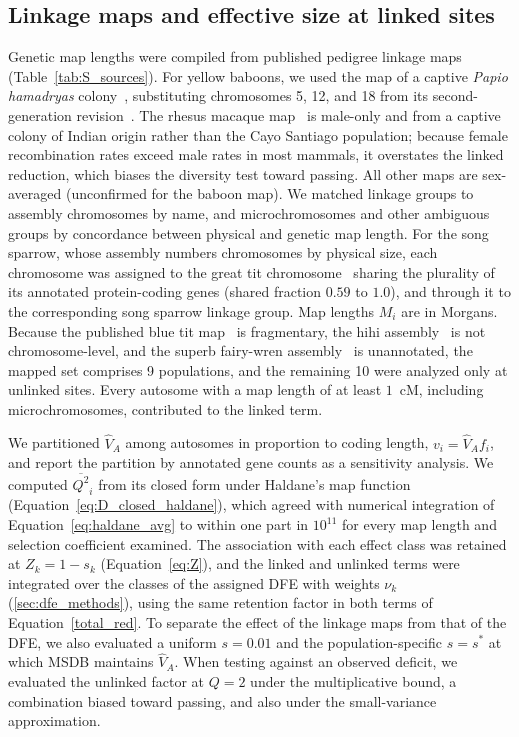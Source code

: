 \documentclass{article}
\begin{document}
\subsection{Linkage maps and effective size at linked sites}\label{sec:linked_methods}
Genetic map lengths were compiled from published pedigree linkage maps (Table~\ref{tab:S_sources}). For yellow baboons, we used the map of a captive \emph{Papio hamadryas} colony~\cite{rogers2000}, substituting chromosomes 5, 12, and 18 from its second-generation revision~\cite{cox2006}. The rhesus macaque map~\cite{versoza2024} is male-only and from a captive colony of Indian origin rather than the Cayo Santiago population; because female recombination rates exceed male rates in most mammals, it overstates the linked reduction, which biases the diversity test toward passing. All other maps are sex-averaged (unconfirmed for the baboon map). We matched linkage groups to assembly chromosomes by name, and microchromosomes and other ambiguous groups by concordance between physical and genetic map length. For the song sparrow, whose assembly numbers chromosomes by physical size, each chromosome was assigned to the great tit chromosome~\cite{laine2016} sharing the plurality of its annotated protein-coding genes (shared fraction $0.59$ to $1.0$), and through it to the corresponding song sparrow linkage group. Map lengths $M_i$ are in Morgans. Because the published blue tit map~\cite{hansson2010} is fragmentary, the hihi assembly~\cite{tan2024} is not chromosome-level, and the superb fairy-wren assembly~\cite{penalba2020} is unannotated, the mapped set comprises 9 populations, and the remaining 10 were analyzed only at unlinked sites. Every autosome with a map length of at least $1$~cM, including microchromosomes, contributed to the linked term.

We partitioned $\hat{V}_A$ among autosomes in proportion to coding length, $v_i = \hat{V}_A f_i$, and report the partition by annotated gene counts as a sensitivity analysis. We computed $\overline{Q^2}_i$ from its closed form under Haldane's map function (Equation~\eqref{eq:D_closed_haldane}), which agreed with numerical integration of Equation~\eqref{eq:haldane_avg} to within one part in $10^{11}$ for every map length and selection coefficient examined. The association with each effect class was retained at $Z_k = 1 - s_k$ (Equation~\eqref{eq:Z}), and the linked and unlinked terms were integrated over the classes of the assigned DFE with weights $\nu_k$ (\autoref{sec:dfe_methods}), using the same retention factor in both terms of Equation~\eqref{total_red}. To separate the effect of the linkage maps from that of the DFE, we also evaluated a uniform $s = 0.01$ and the population-specific $s = s^*$ at which MSDB maintains $\hat{V}_A$. When testing against an observed deficit, we evaluated the unlinked factor at $Q = 2$ under the multiplicative bound, a combination biased toward passing, and also under the small-variance approximation.
\end{document}
